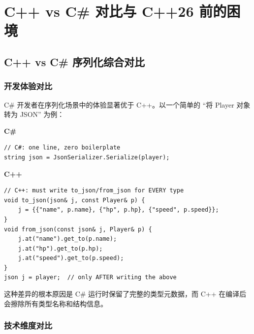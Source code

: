 \documentclass[12pt,a4paper,fontset=fandol]{ctexbook}
\newcommand{\cpplabel}{%
  \noindent\begin{tcolorbox}[colback=algheadbg,coltext=white,
    sharp corners,boxrule=0pt,width=3.0em,height=1.4em,
    halign=center,valign=center,nobeforeafter,left=0pt,right=0pt,
    top=0pt,bottom=0pt]\small\bfseries C++\end{tcolorbox}}
\newcommand{\csharplabel}{%
  \noindent\begin{tcolorbox}[colback=csharpheadbg,coltext=white,
    sharp corners,boxrule=0pt,width=3.2em,height=1.4em,
    halign=center,valign=center,nobeforeafter,left=0pt,right=0pt,
    top=0pt,bottom=0pt]\small\bfseries C\#\end{tcolorbox}}
\begin{document}
\part{C++ vs C\# 对比与 C++26 前的困境}

\chapter{C++ vs C\# 序列化综合对比}\label{ch:cross-compare}

\section{开发体验对比}\label{sec:dx-compare}

C\# 开发者在序列化场景中的体验显著优于 C++。以一个简单的 ``将 Player 对象转为 JSON'' 为例：

\csharplabel
\begin{lstlisting}[style=csharpstyle,caption={C\#: 一行代码完成序列化}]
// C#: one line, zero boilerplate
string json = JsonSerializer.Serialize(player);
\end{lstlisting}

\cpplabel
\begin{lstlisting}[caption={C++ (nlohmann/json): 需要手写 to\_json / from\_json}]
// C++: must write to_json/from_json for EVERY type
void to_json(json& j, const Player& p) {
    j = {{"name", p.name}, {"hp", p.hp}, {"speed", p.speed}};
}
void from_json(const json& j, Player& p) {
    j.at("name").get_to(p.name);
    j.at("hp").get_to(p.hp);
    j.at("speed").get_to(p.speed);
}
json j = player;  // only AFTER writing the above
\end{lstlisting}

这种差异的根本原因是 C\# 运行时保留了完整的类型元数据，而 C++ 在编译后会擦除所有类型名称和结构信息。

\section{技术维度对比}\label{sec:tech-compare}
\end{document}
